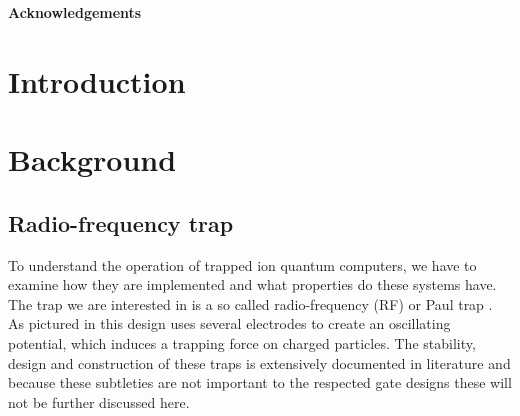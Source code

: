 \documentclass[12pt,twoside]{report}
\begin{document}
\fancyhead[RE,LO]{}
\setcounter{abstractpage}{\value{page}}

\begin{abstract}
\thispagestyle{fancy}
\setcounter{page}{\value{abstractpage}}

	
\setcounter{abstractpage}{\value{page}}
\end{abstract}

\setcounter{page}{\value{abstractpage}}
\newpage

\vspace*{\fill}
\begin{center}
	\textbf{Acknowledgements}\\

\end{center}
\vspace*{\fill}
\newpage

\tableofcontents
\listoffigures

\clearpage{\pagestyle{empty}\cleardoublepage}
\setcounter{page}{1}
\fancyhead[LE,RO]{\slshape \rightmark}
\fancyhead[LO,RE]{\slshape \leftmark}

\chapter{Introduction}
\label{Intro}

\chapter{Background}
\label{Background}

\section{Radio-frequency trap}
\label{Background:RF_Trap}

To understand the operation of trapped ion quantum computers, we have to examine how they are implemented and what properties do these systems have. The trap we are interested in is a so called radio-frequency (RF) or Paul trap \cite{RF_Traps, Charged_Particle_traps_Paul}. As pictured in  this design uses several electrodes to create an oscillating potential, which induces a trapping force on charged particles. The stability, design and construction of these traps is extensively documented in literature \cite{Charged_Particle_traps_Paul,RF_Traps} and because these subtleties are not important to the respected gate designs these will not be further discussed here.
\end{document}
